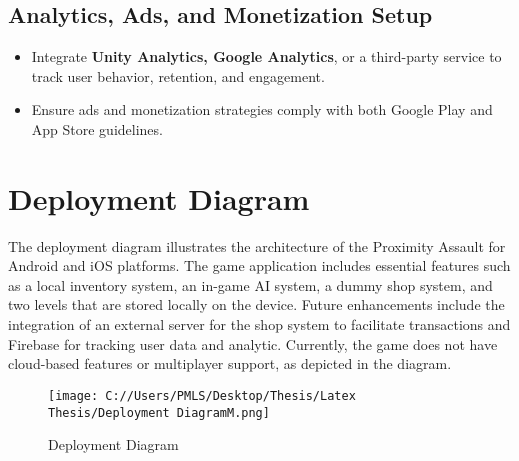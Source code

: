 	\subsection{Analytics, Ads, and Monetization Setup}
	\begin{itemize}
		\item {Integrate\textbf{ Unity Analytics, Google Analytics}, or a third-party service to track user behavior, retention, and engagement.}
		\item {Ensure ads and monetization strategies comply with both Google Play and App Store guidelines.}
	\end{itemize}

\section{Deployment Diagram}

The deployment diagram illustrates the architecture of the Proximity Assault for Android and iOS platforms. The game application includes essential features such as a local inventory system, an in-game AI system, a dummy shop system, and two levels that are stored locally on the device. Future enhancements include the integration of an external server for the shop system to facilitate transactions and Firebase for tracking user data and analytic. Currently, the game does not have cloud-based features or multiplayer support, as depicted in the diagram.\\
\begin{figure}[H]
	\centering
	\texttt{[image: C://Users/PMLS/Desktop/Thesis/Latex Thesis/Deployment DiagramM.png]}
	\caption{Deployment Diagram}
	\label{fig:Deployement Diagram}
\end{figure}